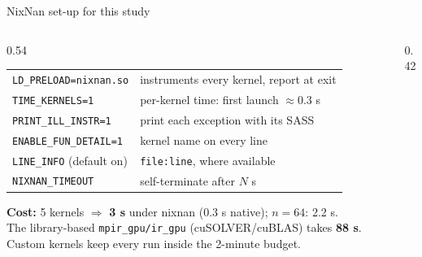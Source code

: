 \documentclass[aspectratio=169,10pt,xcolor=table]{beamer}
\begin{document}
\begin{frame}{NixNan set-up for this study}
\scriptsize
\begin{columns}[T]\begin{column}{0.54\textwidth}
\begin{tabular}{@{}p{3.3cm}p{3.7cm}@{}}
\toprule
\texttt{LD\_PRELOAD=nixnan.so} & instruments every kernel, report at exit\\
\texttt{TIME\_KERNELS=1} & per-kernel time: first launch $\approx$0.3 s\\
\texttt{PRINT\_ILL\_INSTR=1} & print each exception with its SASS\\
\texttt{ENABLE\_FUN\_DETAIL=1} & kernel name on every line\\
\texttt{LINE\_INFO} (default on) & \texttt{file:line}, where available\\
\texttt{NIXNAN\_TIMEOUT} & self-terminate after $N$ s\\
\bottomrule
\end{tabular}

\vspace{3mm}
\normalsize\textbf{Cost:} 5 kernels $\Rightarrow$ \textbf{3 s} under nixnan (0.3 s native); $n{=}64$: 2.2 s.\\[1mm]
\footnotesize The library-based \texttt{mpir\_gpu/ir\_gpu} (cuSOLVER/cuBLAS) takes \textbf{88 s}. Custom kernels keep every run inside the 2-minute budget.
\end{column}\begin{column}{0.42\textwidth}

\end{column}\end{columns}
\end{frame}
\end{document}
